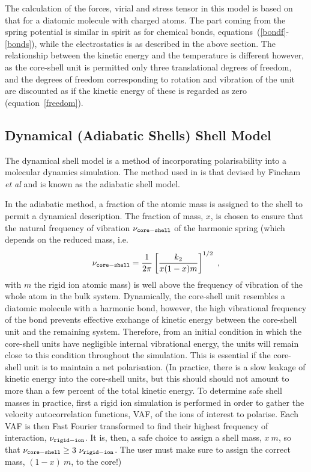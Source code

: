 The calculation of the forces, virial and stress tensor in this model is based on that for a diatomic molecule
with charged atoms.  The part coming from the spring potential is
similar in spirit as for chemical bonds, equations~(\ref{bondf}-\ref{bonds}),
while the electrostatics is as described in the above section.
The relationship between the kinetic energy and the temperature is
different however, as the core-shell unit is permitted only three
translational degrees of freedom, and the degrees of freedom
corresponding to rotation and vibration of the unit are discounted
as if the kinetic energy of these is regarded as zero (equation~\ref{freedom}).

\subsection{Dynamical (Adiabatic Shells) Shell Model}

The dynamical shell model is a method of incorporating
polarisability into a molecular dynamics simulation.
The method used in \D is that devised by Fincham {\em et al}
\cite{fincham-93a} and is known as the adiabatic shell model.

In the adiabatic method, a fraction of the atomic mass is assigned
to the shell to permit a dynamical description.  The fraction of
mass, $x$, is chosen to ensure that the natural frequency of
vibration $\nu_{\tt core-shell}$ of the harmonic spring (which
depends on the reduced mass, i.e.
\begin{equation}
\nu_{\tt core-shell} = \frac{1}{2\pi} \left[ \frac{k_{2}}{x(1-x)m} \right]^{1/2}~,
\end{equation}
with $m$ the rigid ion atomic mass) is well above the frequency of
vibration of the whole atom in the bulk system.  Dynamically,
the core-shell unit resembles a diatomic molecule with a harmonic
bond, however, the high vibrational
frequency of the bond prevents effective exchange of kinetic
energy between the core-shell unit and the remaining system.
Therefore, from an initial condition in which the core-shell units
have negligible internal vibrational energy, the units will remain
close to this condition throughout the simulation.  This is
essential if the core-shell unit is to maintain a net
polarisation.  (In practice, there is a slow
leakage of kinetic energy into the core-shell units, but this
should should not amount to more than a few percent of the total
kinetic energy.  To determine safe shell masses in practice,
first a rigid ion simulation is performed in order to gather the
velocity autocorrelation functions, VAF, of the ions of interest
to polarise.  Each VAF is then Fast Fourier transformed to find
their highest frequency of interaction, $\nu_{\tt rigid-ion}$.  It
is, then, a safe choice to assign a shell mass, $x~m$, so that
$\nu_{\tt core-shell} \geq 3~\nu_{\tt rigid-ion}$.  The user must
make sure to assign the correct mass, $(1-x)~m$, to the core!)

